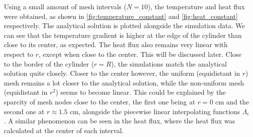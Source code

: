Using a small amount of mesh intervals (\(N=10\)), the temperature and heat flux were obtained, as shown in \autoref{fig:temperature_constant} and \autoref{fig:heat_constant} respectively. The analytical solution is plotted alongside the simulation data. We can see that the temperature gradient is higher at the edge of the cylinder than close to its center, as expected. The heat flux also remains very linear with respect to \(r\), except when close to the center. This will be discussed later. Close to the border of the cylinder (\(r=R\)), the simulations match the analytical solution quite closely. Closer to the center however, the uniform (equidistant in \(r\)) mesh remains a lot closer to the analytical solution, while the non-uniform mesh (equidistant in \(r^2\)) seems to become linear. This could be explained by the sparcity of mesh nodes close to the center, the first one being at \(r=0\) \si{\centi\meter} and the second one at \(r \approx 1.5\) \si{\centi\meter}, alongside the piecewise linear interpolating functions \(\Lambda_i\). A similar phenomenon can be seen in the heat flux, where the heat flux was calculated at the center of each interval.

